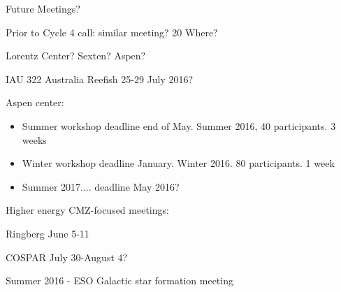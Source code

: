 Future Meetings?

Prior to Cycle 4 call: similar meeting?  20
Where?  

Lorentz Center?  Sexten?  Aspen?

IAU 322 Australia Reefish 25-29 July 2016?

Aspen center:
\begin{itemize}
\item Summer workshop deadline end of May.  Summer 2016, 40 participants.  3 weeks
\item Winter workshop deadline January.  Winter 2016.  80 participants.  1 week
\item Summer 2017.... deadline May 2016?
\end{itemize}

Higher energy CMZ-focused meetings:

Ringberg June 5-11 

COSPAR July 30-August 4?

Summer 2016 - ESO Galactic star formation meeting
